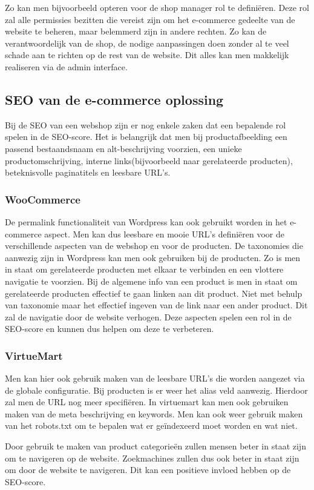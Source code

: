 Zo kan men bijvoorbeeld opteren voor de shop manager rol te definiëren. Deze rol zal alle permissies bezitten die vereist zijn om het e-commerce gedeelte van de website te beheren, maar belemmerd zijn in andere rechten. Zo kan de verantwoordelijk van de shop, de nodige aanpassingen doen zonder al te veel schade aan te richten op de rest van de website. Dit alles kan men makkelijk realiseren via de admin interface.
\subsection{SEO van de e-commerce oplossing}
Bij de SEO van een webshop zijn er nog enkele zaken dat een bepalende rol spelen in de SEO-score. Het is belangrijk dat men bij productafbeelding een passend bestaandsnaam en alt-beschrijving voorzien, een unieke productomschrijving, interne links(bijvoorbeeld naar gerelateerde producten), beteknisvolle paginatitels en leesbare URL's.
\subsubsection{WooCommerce}
De permalink functionaliteit van Wordpress kan ook gebruikt worden in het e-commerce aspect. Men kan dus leesbare en mooie URL's definiëren voor de verschillende aspecten van de webshop en voor de producten. De taxonomies die aanwezig zijn in Wordpress kan men ook gebruiken bij de producten. Zo is men in staat om gerelateerde producten met elkaar te verbinden en een vlottere navigatie te voorzien. Bij de algemene info van een product is men in staat om gerelateerde producten effectief te gaan linken aan dit product. Niet met behulp van taxonomie maar het effectief ingeven van de link naar een ander product. Dit zal de navigatie door de website verhogen. Deze aspecten spelen een rol in de SEO-score en kunnen dus helpen om deze te verbeteren.
\subsubsection{VirtueMart}
Men kan hier ook gebruik maken van de leesbare URL's die worden aangezet via de globale configuratie. Bij producten is er weer het alias veld aanwezig. Hierdoor zal men de URL nog meer specifiëren. In virtuemart kan men ook gebruiken maken van de meta beschrijving en keywords. Men kan ook weer gebruik maken van het robots.txt om te bepalen wat er geïndexeerd moet worden en wat niet.

Door gebruik te maken van product categorieën zullen mensen beter in staat zijn om te navigeren op de website. Zoekmachines zullen dus ook beter in staat zijn om door de website te navigeren. Dit kan een positieve invloed hebben op de SEO-score.

